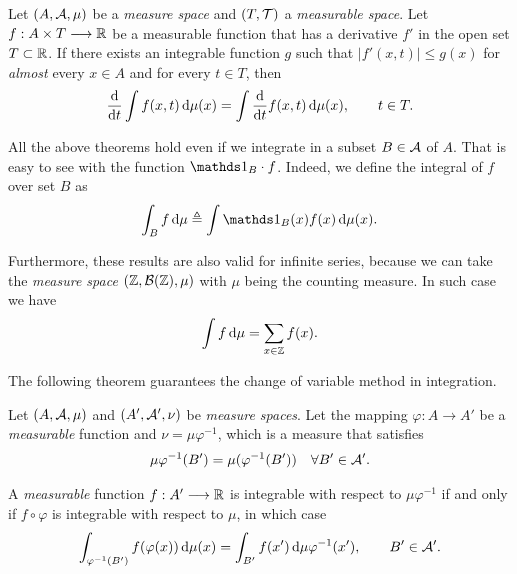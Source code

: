 \begin{theorem} \label{th:leibniz}
    Let $(A,\cal A, \mu)$ be a \textit{measure space} and $(T, \cal T)$ a \textit{measurable space}.
    Let $f:A\times T \longrightarrow \R$ be a measurable function that has a derivative $f'$ in the open set $T\subset\R$.
    If there exists an integrable function $g$ such that $|f'(x,t)|\le g(x)$ for \textit{almost} every $x\in A$ and for every $t\in T$, then
    \begin{align*}
        \frac{\d}{\d t} \int f(x,t)\,\d\mu(x) = \int \frac{\d}{\d t} f(x,t) \,\d\mu(x), \qquad t \in T.
    \end{align*}
\end{theorem}

All the above theorems hold even if we integrate in a subset $B\in\cal A$ of $A$. That is easy to see with the function $\ind_B \cdot f$.
%
Indeed, we define the integral of $f$ over set $B$ as
\begin{align*}
    \int_B f\,\d\mu \triangleq \int \ind_B(x) f(x) \,\d\mu(x).
\end{align*}

Furthermore, these results are also valid for infinite series, because we can take the \textit{measure space} $(\Z,\cal B(\Z), \mu)$ with $\mu$ being the counting measure. In such case we have
\begin{align*}
    \int f\,\d\mu = \sum_{x\in\Z} f(x).
\end{align*}

The following theorem guarantees the change of variable method in integration.

\begin{theorem}
    Let $(A,\cal A, \mu)$ and $(A', \cal A', \nu)$ be \textit{measure spaces}.
    Let the mapping $\varphi:A\longrightarrow A'$ be a \textit{measurable} function and $\nu = \mu\varphi^{-1}$, which is a measure that satisfies \vspace{-5mm}
    \begin{align*}
        \mu\varphi^{-1}(B') = \mu(\varphi^{-1}(B')) \quad \forall B'\in\cal{A}'.
    \end{align*}
    
    A \textit{measurable} function $f:A'\longrightarrow\R$ is integrable with respect to $\mu\varphi^{-1}$ if and only if $f\circ\varphi$ is integrable with respect to $\mu$, in which case
    \begin{align*}
        \int_{\varphi^{-1}(B')} f(\varphi(x))\,\d\mu(x) = \int_{B'} f(x') \,\d\mu\varphi^{-1}(x'), \qquad B'\in\cal{A}'.
    \end{align*}
\end{theorem}

